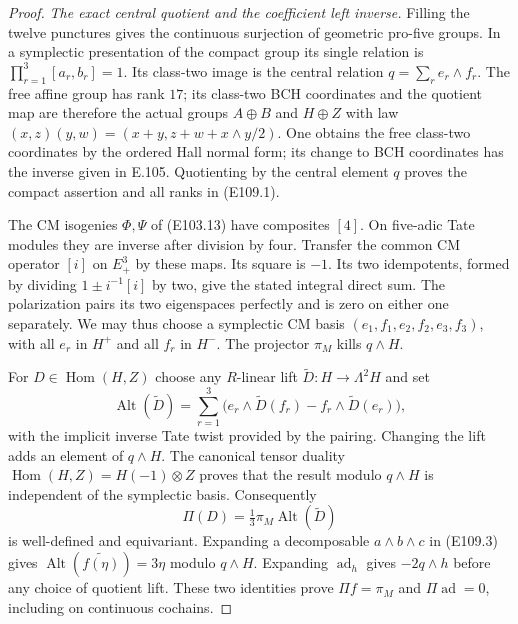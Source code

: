 \begin{proof}
\emph{The exact central quotient and the coefficient left inverse.}
Filling the twelve punctures gives the continuous surjection of
geometric pro-five groups.  In a symplectic presentation of the
compact group its single relation is
$\prod_{r=1}^3[a_r,b_r]=1$.  Its class-two image is the central
relation $q=\sum_re_r\wedge f_r$.  The free affine group has
rank $17$; its class-two BCH coordinates and the quotient map are
therefore the actual groups $A\oplus B$ and $H\oplus Z$ with law
$(x,z)(y,w)=(x+y,z+w+x\wedge y/2)$.
One obtains the free class-two coordinates by the ordered Hall
normal form; its change to BCH coordinates has the inverse given
in E.105.  Quotienting by the central element $q$ proves the
compact assertion and all ranks in (E109.1).

The CM isogenies $\Phi,\Psi$ of (E103.13) have composites $[4]$.
On five-adic Tate modules they are inverse after division by
four.  Transfer the common CM operator $[i]$ on $E_+^3$ by these
maps.  Its square is $-1$.  Its two idempotents, formed by dividing
$1\pm i^{-1}[i]$ by two, give the stated integral direct sum.
The polarization pairs its two eigenspaces perfectly and is zero
on either one separately.  We may thus choose a symplectic CM
basis $(e_1,f_1,e_2,f_2,e_3,f_3)$, with all $e_r$ in $H^+$
and all $f_r$ in $H^-$.  The projector $\pi_M$ kills
$q\wedge H$.

For $D\in\operatorname{Hom}(H,Z)$ choose any $R$-linear lift
$\widetilde D:H\to\Lambda^2H$ and set
\[
 \operatorname{Alt}(\widetilde D)=
 \sum_{r=1}^3
  \bigl(e_r\wedge\widetilde D(f_r)
                -f_r\wedge\widetilde D(e_r)\bigr),
 \tag{E109.9}
\]
with the implicit inverse Tate twist provided by the pairing.
Changing the lift adds an element of $q\wedge H$.
The canonical tensor duality
$\operatorname{Hom}(H,Z)=H(-1)\otimes Z$ proves that the
result modulo $q\wedge H$ is independent of the symplectic
basis.  Consequently
\[
       \Pi(D)=\tfrac13\pi_M\operatorname{Alt}(\widetilde D)
 \tag{E109.10}
\]
is well-defined and equivariant.  Expanding a decomposable
$a\wedge b\wedge c$ in (E109.3) gives
$\operatorname{Alt}(\widetilde{f(\eta)})=3\eta$
modulo $q\wedge H$.  Expanding $\operatorname{ad}_h$ gives
$-2q\wedge h$ before any choice of quotient lift.  These two
identities prove $\Pi f=\pi_M$ and $\Pi\operatorname{ad}=0$,
including on continuous cochains.


\end{proof}

